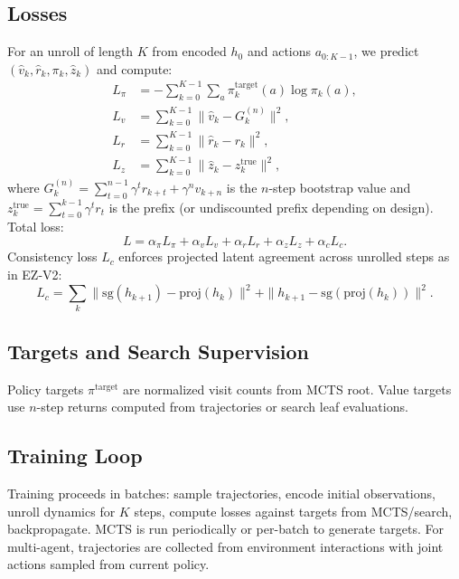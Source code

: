 \documentclass{article}
\begin{document}
\subsection{Losses}
For an unroll of length $K$ from encoded $h_0$ and actions $a_{0:K-1}$, we predict $(\hat v_k,\hat r_k,\pi_k,\hat z_k)$ and compute:
\begin{align}
L_\pi &= -\sum_{k=0}^{K-1}\sum_a \pi^{\text{target}}_k(a)\log \pi_k(a),\\
L_v &= \sum_{k=0}^{K-1} \|\hat v_k - G_k^{(n)}\|^2,\\
L_r &= \sum_{k=0}^{K-1} \|\hat r_k - r_k\|^2,\\
L_z &= \sum_{k=0}^{K-1} \|\hat z_k - z^{\text{true}}_k\|^2,
\end{align}
where $G_k^{(n)}=\sum_{t=0}^{n-1}\gamma^t r_{k+t}+\gamma^n v_{k+n}$ is the $n$-step bootstrap value and $z^{\text{true}}_k=\sum_{t=0}^{k-1}\gamma^t r_t$ is the prefix (or undiscounted prefix depending on design).
Total loss:
\begin{equation}
L = \alpha_\pi L_\pi + \alpha_v L_v + \alpha_r L_r + \alpha_z L_z + \alpha_c L_c .
\end{equation}
Consistency loss $L_c$ enforces projected latent agreement across unrolled steps as in EZ-V2:
\begin{equation}
L_c = \sum_{k}\|\mathrm{sg}(h_{k+1}) - \mathrm{proj}(h_k)\|^2 + \|h_{k+1} - \mathrm{sg}(\mathrm{proj}(h_k))\|^2.
\end{equation}

\subsection{Targets and Search Supervision}
Policy targets $\pi^{\text{target}}$ are normalized visit counts from MCTS root. Value targets use $n$-step returns computed from trajectories or search leaf evaluations.

\subsection{Training Loop}
Training proceeds in batches: sample trajectories, encode initial observations, unroll dynamics for $K$ steps, compute losses against targets from MCTS/search, backpropagate. MCTS is run periodically or per-batch to generate targets. For multi-agent, trajectories are collected from environment interactions with joint actions sampled from current policy.
\end{document}
